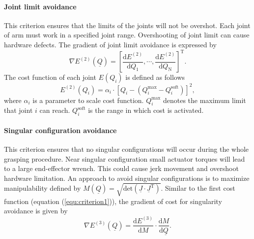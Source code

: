 \paragraph{Joint limit avoidance} This criterion ensures that the limits of the joints will not be overshot. Each joint of arm must work in a specified joint range. Overshooting of joint limit can cause hardware defects. The gradient of joint limit avoidance is expressed by 
\begin{equation}
\nabla E^{(2)}(\underline{Q}) = \left[\dfrac{\text{d}E^{(2)}}{\text{d}Q_1},\cdots,\dfrac{\text{d}E^{(2)}}{\text{d}Q_\text{N}}\right]^\text{T}.
\end{equation}
The cost function of each joint $E(Q_i)$ is defined as follows
\begin{equation}
  E^{(2)}(Q_i) = \alpha_i \cdot \left[Q_i - ( Q_i^{\text{max}} -   Q_i^{\text{soft}}) \right]^2,
\end{equation}
where  $\alpha_i$ is a parameter to scale cost function. $Q_i^{\text{max}}$ denotes the maximum limit that joint $i$ can reach. $Q_i^{\text{soft}}$ is the range in which cost is activated.   
\paragraph{Singular configuration avoidance} This criterion ensures that no singular configurations will occur during the whole grasping procedure. 
Near singular configuration small actuator torques will lead to a large end-effector wrench. This could cause jerk movement and overshoot hardware limitation. An approach to avoid singular configurations is to maximize manipulability defined by  
$M(\underline{Q}) = \sqrt{ \text{det}( \underline{J} \cdot \underline{J}^\text{T})}$. Similar to the first cost function (equation (\ref{equ:criterion1})), the gradient of cost for singularity avoidance is given by 
\begin{equation}
 \nabla E^{(3)}(\underline{Q}) = \dfrac{ \text{d}E^{(3)}}{\text {d}M} \cdot \dfrac{\text{d}M}{\text{d}\underline{Q}}.
\end{equation}

